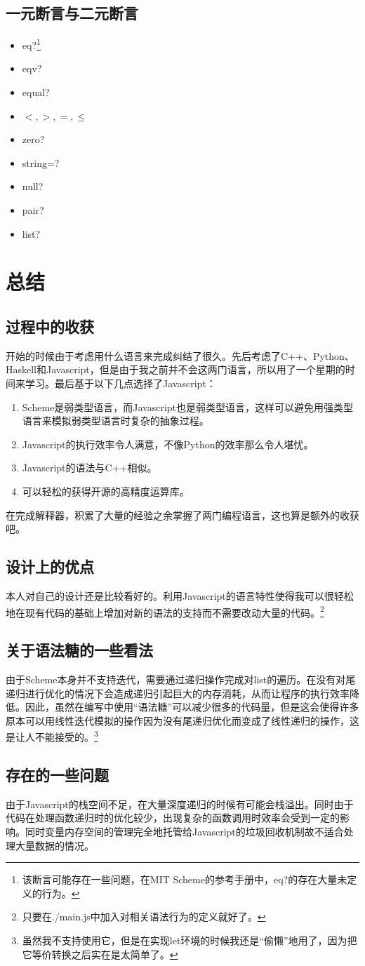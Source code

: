 \documentclass[11pt, a4paper]{article}
\begin{document}
		\subsection{一元断言与二元断言}
			\begin{itemize}
				\item eq?\footnote{该断言可能存在一些问题，在MIT Scheme的参考手册中，eq?的存在大量未定义的行为。}
				\item eqv?
				\item equal?
				\item $<,>,=,\leq$
				\item zero?
				\item string=?
				\item null?
				\item pair?
				\item list?
			\end{itemize}
	\section{总结}
		\subsection{过程中的收获}
			开始的时候由于考虑用什么语言来完成纠结了很久。先后考虑了C++、Python、Haskell和Javascript，但是由于我之前并不会这两门语言，所以用了一个星期的时间来学习。最后基于以下几点选择了Javascript：
			\begin{enumerate}
				\item Scheme是弱类型语言，而Javascript也是弱类型语言，这样可以避免用强类型语言来模拟弱类型语言时复杂的抽象过程。
				\item Javascript的执行效率令人满意，不像Python的效率那么令人堪忧。
				\item Javascript的语法与C++相似。
				\item 可以轻松的获得开源的高精度运算库。
			\end{enumerate}	
			
			在完成解释器，积累了大量的经验之余掌握了两门编程语言，这也算是额外的收获吧。
		\subsection{设计上的优点}
			本人对自己的设计还是比较看好的。利用Javascript的语言特性使得我可以很轻松地在现有代码的基础上增加对新的语法的支持而不需要改动大量的代码。\footnote{只要在./main.js中加入对相关语法行为的定义就好了。}
		\subsection{关于语法糖的一些看法}
			由于Scheme本身并不支持迭代，需要通过递归操作完成对list的遍历。在没有对尾递归进行优化的情况下会造成递归引起巨大的内存消耗，从而让程序的执行效率降低。因此，虽然在编写中使用“语法糖”可以减少很多的代码量，但是这会使得许多原本可以用线性迭代模拟的操作因为没有尾递归优化而变成了线性递归的操作，这是让人不能接受的。\footnote{虽然我不支持使用它，但是在实现let环境的时候我还是“偷懒”地用了，因为把它等价转换之后实在是太简单了。}
		\subsection{存在的一些问题}
			由于Javascript的栈空间不足，在大量深度递归的时候有可能会栈溢出。同时由于代码在处理函数递归时的优化较少，出现复杂的函数调用时效率会受到一定的影响。同时变量内存空间的管理完全地托管给Javascript的垃圾回收机制故不适合处理大量数据的情况。
\end{document}
